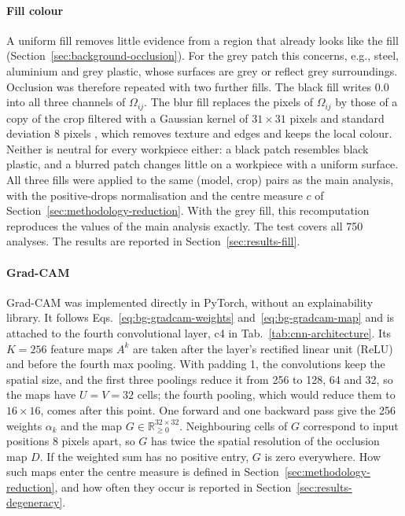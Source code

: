 \paragraph{Fill colour}
\label{sec:methodology-fill}
A uniform fill removes little evidence from a region that already looks like the fill
(Section~\ref{sec:background-occlusion}). For the grey patch this concerns, e.g.,
steel, aluminium and grey plastic, whose surfaces are grey or reflect grey
surroundings. Occlusion was therefore repeated with two further fills. The black fill
writes 0.0 into all three channels of $\Omega_{ij}$. The blur fill replaces the pixels
of $\Omega_{ij}$ by those of a copy of the crop filtered with a Gaussian kernel of
$31 \times 31$ pixels and standard deviation 8 pixels \citep{torchvision2025gaussianblur}, which
removes texture and edges and keeps the local colour. Neither is neutral for every
workpiece either: a black patch resembles black plastic, and a blurred patch changes
little on a workpiece with a uniform surface. All three fills were applied to the same
(model, crop) pairs as the main analysis, with the positive-drops normalisation and the
centre measure $c$ of Section~\ref{sec:methodology-reduction}. With the grey fill, this
recomputation reproduces the values of the main analysis exactly. The test covers all
750 analyses. The results are reported in
Section~\ref{sec:results-fill}.

\paragraph{Grad-CAM}
\label{sec:methodology-gradcam-impl}
Grad-CAM was implemented directly in PyTorch, without an explainability library. It
follows Eqs.~\eqref{eq:bg-gradcam-weights} and~\eqref{eq:bg-gradcam-map} and
is attached to the fourth convolutional layer, c4 in Tab.~\ref{tab:cnn-architecture}.
Its $K = 256$ feature maps $A^k$ are taken after the layer's rectified linear unit
(ReLU) and before the fourth max pooling. With padding 1, the convolutions keep the
spatial size, and the first three poolings reduce it from 256 to 128, 64 and 32, so the
maps have $U = V = 32$ cells; the fourth pooling, which would reduce them to
$16 \times 16$, comes after this point. One forward and one backward pass give the 256
weights $\alpha_k$ and the map $G \in \mathbb{R}_{\ge 0}^{32 \times 32}$. Neighbouring
cells of $G$ correspond to input positions 8 pixels apart, so $G$ has twice the spatial
resolution of the occlusion map $D$. If the weighted sum has no positive entry, $G$ is
zero everywhere. How such maps enter the centre measure is defined in
Section~\ref{sec:methodology-reduction}, and how often they occur is reported in
Section~\ref{sec:results-degeneracy}.

